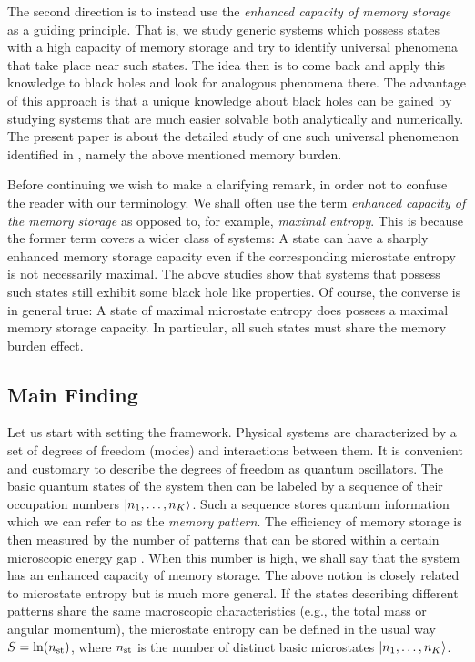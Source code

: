 \documentclass[aps,prd,reprint,superscriptaddress,nofootinbib]{revtex4-2}
\begin{document}
The second direction  \cite{1207.4059, 1507.02948, 1507.08952, 1601.01329, 1711.09079,1801.03918, 1712.02233, 1805.10292, 1810.02336, 1812.08749, 1906.03530, 1907.07332, 2003.05546}
is to instead use the {\it enhanced capacity of memory storage} as a guiding principle. 
That is, we study generic systems which possess states with a high capacity of memory storage and try to
identify universal phenomena that 
take place  near such states.  The idea then is to come back and apply this 
knowledge to black holes and look for analogous phenomena there. 
The advantage of this approach is that a unique knowledge about 
black holes can be gained by studying systems that are much easier solvable both analytically and numerically. 
The present paper is about the detailed study of one such universal 
phenomenon identified in \cite{1810.02336, 1812.08749}, namely the above mentioned memory burden.  

Before continuing we wish to make a clarifying remark, in order not 
to confuse the reader with our terminology.  We shall often use the term 
{\it enhanced capacity of the memory storage} as opposed 
to, for example, {\it maximal entropy}.
This is because the  former term covers a wider class of systems:
A state can have a sharply 
enhanced memory storage capacity even if the corresponding microstate entropy is not necessarily maximal.  The above studies show that systems that possess such states still exhibit some black hole like properties.  Of course, the converse is in general true:  A state of maximal microstate entropy does possess a maximal memory storage capacity.  In particular, all such states must share the memory burden effect.  
 

\subsection{Main Finding} 
 Let us start with setting the framework.
 Physical systems are characterized by a set of degrees 
 of freedom (modes) and interactions between them.  It is convenient 
 and customary to 
 describe the degrees of freedom as quantum oscillators. 
 The basic quantum states of the system then can be 
 labeled by a sequence of their occupation numbers
 $\ket{n_1,\ldots ,n_K}$.   
 Such a sequence stores quantum information which we can refer 
 to as the {\it memory pattern}.  The efficiency of memory storage is then 
 measured by the number of patterns that can be stored within a certain 
 microscopic energy gap \cite{1801.03918, 1805.10292}.  When this number is high, we shall say that 
 the system has an enhanced capacity of memory storage. 
 The above notion is closely related 
 to microstate entropy but is much more general. If the states describing 
different patterns
 share the same macroscopic characteristics (e.g., the total mass 
 or angular momentum), the microstate entropy can be defined in the usual  way  $S = \ln (n_{\rm st})$, where $n_{\rm st}$ is the number of 
 distinct basic microstates $\ket{n_1,\ldots,n_K}$.  
\end{document}

